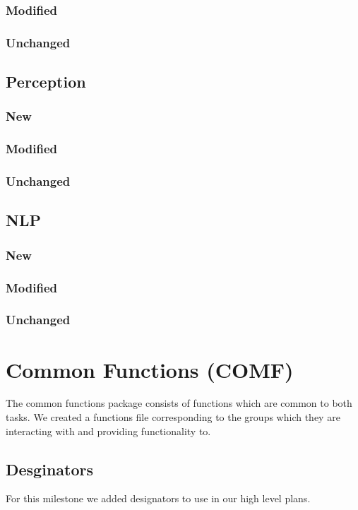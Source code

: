 \documentclass[main.tex]{subfiles}
\begin{document}
                \subsubsection{Modified}
                \subsubsection{Unchanged}
                \subsection{Perception}
                \subsubsection{New}
                \subsubsection{Modified}
                \subsubsection{Unchanged}
                \subsection{NLP}
                \subsubsection{New}
                \subsubsection{Modified}
                \subsubsection{Unchanged}

                
                \section{Common Functions (COMF)}
                The common functions package consists of functions which are common to both tasks. We created a functions file corresponding to the groups which they are interacting with and providing functionality to.
                \subsection{Desginators}
                For this milestone we added designators to use in our high level plans.
\end{document}
